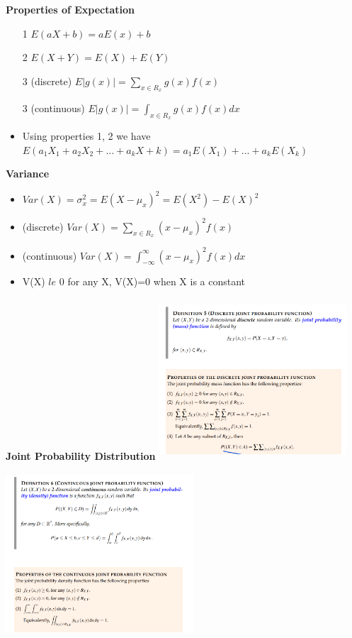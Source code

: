 \documentclass[10pt, landscape]{article}
\begin{document}
\begin{multicols}{4}
\textbf{Properties of Expectation}
\begin{itemize}
  \item[1] $E(aX+b)=aE(x)+b$
  \item[2] $E(X+Y)=E(X)+E(Y)$
  \item[3] (discrete) $E|g(x)|= \sum_{x \in R_x}g(x)f(x)$
  \item[3] (continuous) $E|g(x)|= \int_{x \in R_x}g(x)f(x)dx$
  \item Using properties 1, 2 we have $E(a_1X_1+a_2X_2+...+a_kX+k)=a_1E(X_1)+...+a_kE(X_k)$
\end{itemize}

\textbf{Variance} 
\begin{itemize}
  \item $Var(X)=\sigma_x^2=E(X-\mu_x)^2=E(X^2)-E(X)^2$
  \item (discrete) $Var(X)=\sum_{x \in R_x}(x-\mu_x)^2f(x)$
  \item (continuous) $Var(X)=\int_{-\infty}^{\infty}(x-\mu_x)^2f(x)dx$
  \item V(X) $le$ 0 for any X, V(X)=0 when X is a constant
\end{itemize}

\textbf{Joint Probability Distribution} \newline
\includegraphics[width=7cm, height=6cm]{joint_discrete.png}

\includegraphics[width=7cm, height=6cm]{joint_continuous.png}


\end{multicols}
\end{document}
